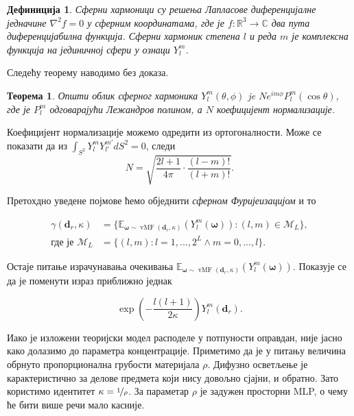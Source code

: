 \documentclass[12pt, a4paper, twoside]{book}
\numberwithin{equation}{chapter}
\newtheorem{theorem}{Теорема}
\numberwithin{theorem}{section}
\newtheorem{definition}{Дефиниција}
\numberwithin{definition}{section}
\numberwithin{definitionChapter}{chapter}
\begin{document}
	\begin{definition}
		Сферни хармоници су решења Лапласове диференцијалне једначине $\nabla^2f = 0$ у сферним координатама, где је
		$f:\mathbb{R}^3\rightarrow\mathbb{C}$ два пута диференцијабилна функција. Сферни хармоник степена $l$ и реда
		$m$ је комплексна функција на јединичној сфери у ознаци $Y_{l}^{m}$.
	\end{definition}

Следећу теорему наводимо без доказа.

	\begin{theorem}
		Општи облик сферног хармоника $Y_{l}^{m}(\theta, \phi)$ je $Ne^{im\phi}P_{l}^{m}(\cos\theta)$, где је
		$P_{l}^{m}$ одговарајући Лежандров полином, а $N$ коефицијент нормализације. 
	\end{theorem}

	Коефицијент нормализације можемо одредити из ортогоналности. Може се показати да из
	$\int_{S^2}Y_{l}^{m}Y_{l\prime}^{m\prime}dS^2 = 0$, следи
	$$N = \sqrt{\frac{2l + 1}{4\pi}\cdot\frac{(l-m)!}{(l+m)!}}.$$

Претохдно уведене појмове ћемо обједнити \textit{сферном Фуријеизацијом} и то

	\begin{equation}
		\begin{split}
			\gamma(\textbf{d}_r, \kappa) & =
			\{\mathbb{E}_{\boldsymbol{\omega} \sim \operatorname{vMF}(\textbf{d}_r, \kappa)}
			(Y_{l}^{m}(\boldsymbol{\omega})): (l, m) \in \mathcal{M}_L\}, \\
			\text{где је } \mathcal{M}_L & = \{(l, m): l=1, ..., 2^L \land m=0, ..., l\}.
		\end{split}
		\label{eqn-spheric-encoding}
	\end{equation}

Остаје питање израчунавања очекивања
$\mathbb{E}_{\boldsymbol{\omega} \sim \operatorname{vMF}(\textbf{d}_r, \kappa)}(Y_{l}^{m}(\boldsymbol{\omega}))$.
Показује се \cite{ref-nerf} да је поменути израз приближно једнак

	\begin{equation}
		\exp\left(-\frac{l(l+1)}{2\kappa}\right)Y_{l}^{m}(\textbf{d}_r).
	\end{equation}

Иако је изложени теоријски модел расподеле у потпуности оправдан, није јасно како долазимо до параметра концентрације.
Приметимо да је у питању величина обрнуто пропорционална грубости материјала $\rho$. Дифузно осветљење је карактеристично
за делове предмета који нису довољно сјајни, и обратно. Зато користимо идентитет $\kappa = \nicefrac{1}{\rho}$.
За параметар $\rho$ је задужен просторни MLP, о чему ће бити више речи мало касније.
\end{document}

